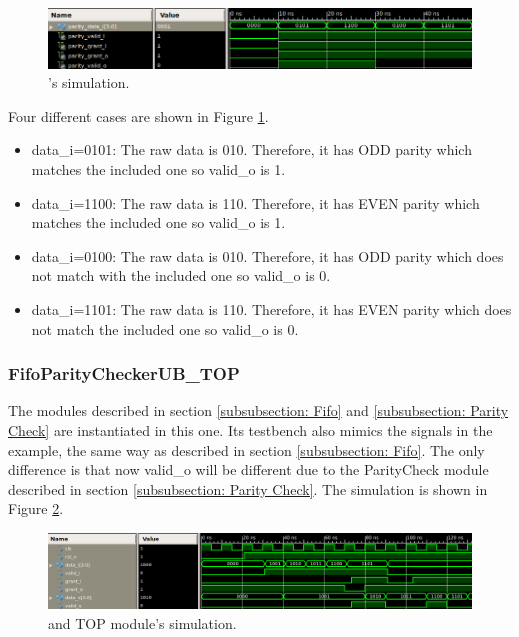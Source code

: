 \documentclass[12pt]{article}
\begin{document}
\begin{figure}[ht]
\centering
\includegraphics[width=15cm]{images/parity-check-simulation}
\caption{\label{fig: ParityCheck simulation} \paritycheck's simulation.}
\end{figure}

Four different cases are shown in Figure \ref{fig: ParityCheck simulation}.
\begin{itemize}
	\item data\_i=0101: The raw data is 010.  Therefore, it has ODD parity which matches the included one so valid\_o is 1.
	\item data\_i=1100: The raw data is 110.  Therefore, it has EVEN parity which matches the included one so valid\_o is 1.
	\item data\_i=0100: The raw data is 010.  Therefore, it has ODD parity which does not match with the included one so valid\_o is 0.
	\item data\_i=1101: The raw data is 110.  Therefore, it has EVEN parity which does not match the included one so valid\_o is 0.
\end{itemize}

\subsubsection{FifoParityCheckerUB\_TOP}
\label{subsubsection:FifoParityCheck TOP}
The modules described in section \ref{subsubsection: Fifo} and \ref{subsubsection: Parity Check} are instantiated in this one.  Its testbench also mimics the signals in the example, the same way as described in section \ref{subsubsection: Fifo}.  The only difference is that now valid\_o will be different due to the ParityCheck module described in section \ref{subsubsection: Parity Check}.  The simulation is shown in Figure \ref{fig: FIFO and Parity TOP simulation}.

\begin{figure}[ht]
\centering
\includegraphics[width=15cm]{images/fifo-paritycheck-TOP-simulation}
\caption{\label{fig: FIFO and Parity TOP simulation}\fifo and \paritycheck TOP module's simulation.}
\end{figure}
\end{document}
